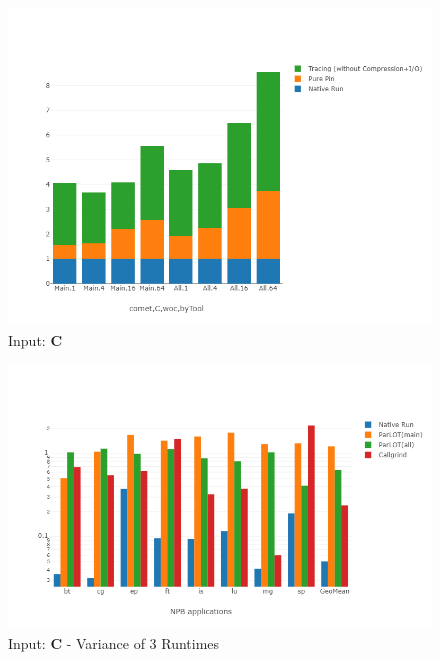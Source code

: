 \begin{figure}[!t]
\centering
\includegraphics[width=6in]{figs.comet/comet_chartDet_C_woc_byTool_p3_5.png}
\caption{ Input: \textbf{C}
}
\label{comet_chartDet_C_woc_byTool_p3_5}
\end{figure}







\begin{figure}[!t]
\centering
\includegraphics[width=6in]{figs.comet/comet_chartAvg_var_C_p3_5.png}
\caption{ Input: \textbf{C}  - Variance of 3 Runtimes
}
\label{comet_chartAvg_var_C_p3_5}
\end{figure}




